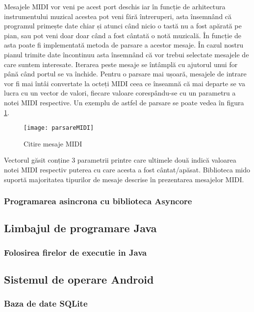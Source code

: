 \documentclass[../IoMusT.tex]{subfiles}
\begin{document}
\par Mesajele MIDI vor veni pe acest port deschis iar în funcție de arhitectura instrumentului muzical acestea pot veni fără întreruperi, asta însemnând că programul primește date chiar și atunci când nicio o tastă nu a fost apărată pe pian, sau pot veni doar doar când a fost cântată o notă muzicală. În funcție de asta poate fi implementată metoda de parsare a acestor mesaje. În cazul nostru pianul trimite date încontinuu asta însemnând că vor trebui selectate mesajele de care suntem interesate. Iterarea peste mesaje se întâmplă cu ajutorul unui for până când portul se va închide. Pentru o parsare mai ușoară, mesajele de intrare vor fi mai întâi convertate la octeți MIDI ceea ce înseamnă că mai departe se va lucra cu un vector de valori, fiecare valoare corespându-se cu un parametru a notei MIDI respective. Un exemplu de astfel de parsare se poate vedea în figura \ref{fig:midiPars}. 
\begin{figure}[h]
\centering
\texttt{[image: parsareMIDI]}
\caption{Citire mesaje MIDI}
\label{fig:midiPars}
\end{figure}
Vectorul găsit conține 3 parametrii printre care ultimele două indică valoarea notei MIDI respectiv puterea cu care acesta a fost cântat/apăsat. Biblioteca mido suportă majoritatea tipurilor de mesaje descrise în prezentarea mesajelor MIDI. 
\subsubsection{Programarea asincrona cu biblioteca Asyncore}

\subsection{Limbajul de programare Java}
\subsubsection{Folosirea firelor de executie in Java}

\subsection{Sistemul de operare Android}
\subsubsection{Baza de date SQLite}
\end{document}

